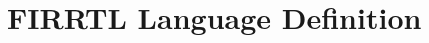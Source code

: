 \documentclass[12pt]{article}
\begin{document}
%
%
%
%
%
%

\section{FIRRTL Language Definition}
\end{document}

